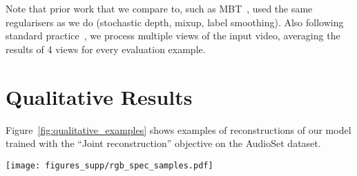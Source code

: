 \documentclass[10pt,twocolumn,letterpaper]{article}
\begin{document}
Note that prior work that we compare to, such as MBT~\cite{nagrani2021attention}, used the same regularisers as we do (stochastic depth, mixup, label smoothing).
Also following standard practice~\cite{arnab2021vivit,carreira_cvpr_2017,nagrani2021attention}, we process multiple views of the input video, averaging the results of 4 views for every evaluation example.





 \section{Qualitative Results}
\label{sec:supp_visualisation}

Figure~\ref{fig:qualitative_examples} shows examples of reconstructions of our model trained with the ``Joint reconstruction'' objective on the AudioSet dataset.

\begin{figure*}[t]
    \centering
    \vspace{-0.5\baselineskip}
    \texttt{[image: figures\_supp/rgb\_spec\_samples.pdf]} 
    \vspace{-0.7\baselineskip}
    \caption{ 
    	Examples of reconstructions of our model, trained with the ``Joint reconstruction'' objective on AudioSet.
    	We show video frames on the left, and audio spectrograms on the right.
    	The first row shows the original input, the second the input after masking, and the final row shows the reconstruction produced by the model. For the unmasked patches in the reconstruction, we show the original input.
    	Note that the model is pretrained with 16 video frames, and we show 8 here for clarity.
    	This figure is best viewed on screen, zoomed in.
	}
	\vspace{-\baselineskip}
    \label{fig:qualitative_examples}
\end{figure*}

  
\end{document}
